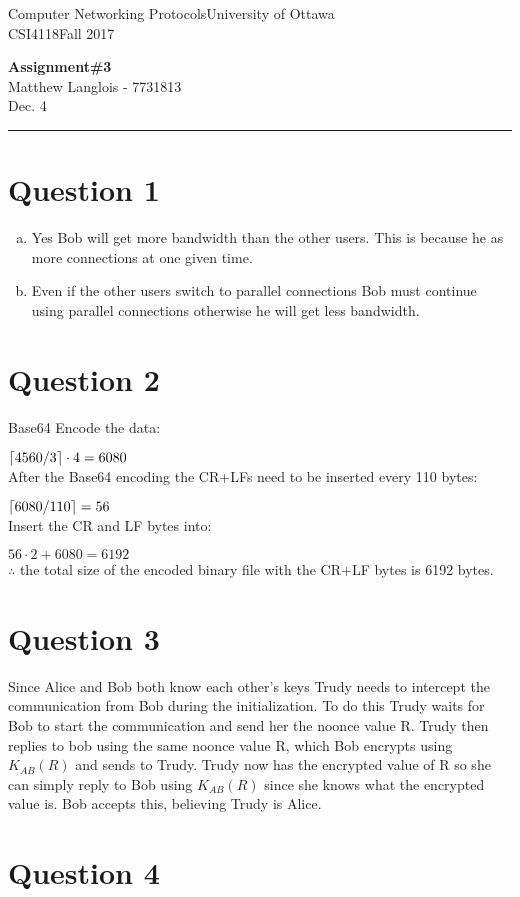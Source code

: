 \documentclass[fleqn, 12pt]{article}
\newcommand{\university}{University of Ottawa}
\newcommand{\name}{Matthew Langlois}
\newcommand{\studentNumber}{7731813}
\newcommand{\semester}{Fall 2017}
\newcommand{\assignmentType}{Assignment}
\newcommand{\assignmentNumber}{3}
\newcommand{\dueDate}{Dec. 4}
\newcommand{\courseCode}{CSI4118}
\newcommand{\courseTitle}{Computer Networking Protocols}
\newcommand{\essayTitle}{<Title>} %
\newcommand{\essaySubtitle}{<subtitle>} %
\newcommand{\essayAbstract}{} %
\DeclarePairedDelimiter\ceil{\lceil}{\rceil}
\newcommand{\beginassignemnt}{
    \newlength\tindent
    \setlength{\tindent}{\parindent}
    \setlength{\parindent}{0pt}

    \thispagestyle{assignment}
    \noindent
    \courseTitle \hfill \university\\
    \courseCode \hfill \semester
    \begin{center}
        \textbf{\assignmentType\text{ }\#\assignmentNumber}\\
        \name \hspace{1pt} - \studentNumber\\
        \dueDate\\
    \end{center}
    \vspace{6pt}
    \hrule
    \vspace{1.5\headsep}
}
\newcommand{\beginessay}{
    \nocite{*}

    \pagestyle{frontmatter}
    \pagenumbering{roman}

    \begin{center}
        \normalsize
        \textsc{\university}\\[5cm]
        \LARGE \textbf{\MakeUppercase{\essayTitle}}\\[0.5cm]
        \large \text{ }\essaySubtitle\text{ }\\[10cm] %
        \normalsize
        \textsc{\name}\\
        \textsc{\studentNumber}\\
        \textsc{\courseCode}\\
        \textsc{\semester}\\
        \textsc{\dueDate}
    \end{center}
    \thispagestyle{empty}

    \newpage
    \tableofcontents
    \newpage

    \iftotalfigures
        \addcontentsline{toc}{section}{\listfigurename}
        \listoffigures
    \fi
    \iftotaltables
        \addcontentsline{toc}{section}{\listtablename}
        \listoftables
    \fi

    \ifdefempty{\essayAbstract}{}{
        \newpage
        \addcontentsline{toc}{section}{Abstract}
        \begin{abstract}
            \essayAbstract
        \end{abstract}

    }
    \label{EndFrontMatter}
    \newpage

    \pagenumbering{arabic}
    \pagestyle{body}
}
\begin{document}
\beginassignemnt


\section*{Question 1}

\begin{enumerate}[a)]
    \item
        Yes Bob will get more bandwidth than the other users. This is because he as more connections at one given time.
    \item
        Even if the other users switch to parallel connections Bob must continue using parallel connections otherwise he will get less bandwidth.
\end{enumerate}

\section*{Question 2}

Base64 Encode the data:

$\ceil{4560/3} \cdot 4 = 6080$\\

After the Base64 encoding the CR+LFs need to be inserted every 110 bytes:

$\ceil{6080/110}=56$\\

Insert the CR and LF bytes into:

$56 \cdot 2 + 6080 = 6192$\\

$\therefore$ the total size of the encoded binary file with the CR+LF bytes is 6192 bytes.

\section*{Question 3}

Since Alice and Bob both know each other's keys Trudy needs to intercept the communication from Bob during the initialization. To do this Trudy waits for Bob to start the communication and send her the noonce value R. Trudy then replies to bob using the same noonce value R, which Bob encrypts using $K_{AB}(R)$ and sends to Trudy. Trudy now has the encrypted value of R so she can simply reply to Bob using $K_{AB}(R)$ since she knows what the encrypted value is. Bob accepts this, believing Trudy is Alice.

\section*{Question 4}
\end{document}
